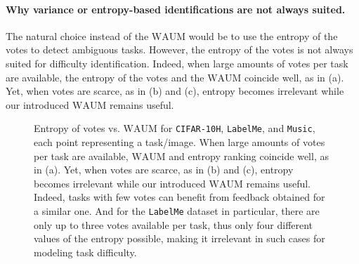 \paragraph{Why variance or entropy-based identifications are not always suited.}

The natural choice instead of the $\mathrm{WAUM}$ would be to use the entropy of the votes to detect ambiguous tasks. However, the entropy of the votes is not always suited for difficulty identification.
Indeed, when large amounts of votes per task are available, the entropy of the votes and the $\mathrm{WAUM}$ coincide well, as in (a).
Yet, when votes are scarce, as in (b) and (c), entropy becomes irrelevant while our introduced $\mathrm{WAUM}$ remains useful.

\begin{figure}[thb]
    \centering
    \hfill
    \hfill
    \hfill
    \hfill
    \caption{Entropy of votes vs. $\mathrm{WAUM}$ for \texttt{CIFAR-10H}, \texttt{LabelMe}, and \texttt{Music}, each point representing a task/image. When large amounts of votes per task are available, $\mathrm{WAUM}$ and entropy ranking coincide well, as in (a). Yet, when votes are scarce, as in (b) and (c), entropy becomes irrelevant while our introduced $\mathrm{WAUM}$ remains useful. Indeed, tasks with few votes can benefit from feedback obtained for a similar one. And for the \texttt{LabelMe} dataset in particular, there are only up to three votes available per task, thus only four different values of the entropy possible, making it irrelevant in such cases for modeling task difficulty.}
    \label{fig:entropy_vs_waum}%
\end{figure}

